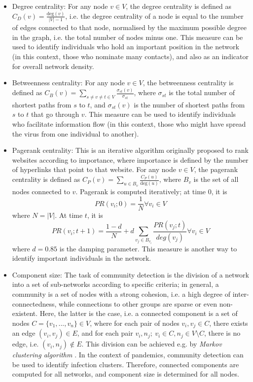 \begin{itemize}
	\item Degree centrality: For any node $v \in V$, the degree centrality is defined as $C_D(v) = \frac{\text{deg}(v)}{\lvert V \rvert - 1}$, i.e. the degree centrality of a node is equal to the number of edges connected to that node, normalised by the maximum possible degree in the graph, i.e. the total number of nodes minus one. This measure can be used to identify individuals who hold an important position in the network (in this context, those who nominate many contacts), and also as an indicator for overall network density.
	\item Betweenness centrality: For any node $v \in V$, the betweenness centrality is defined as $C_B(v) = \sum_{s\neq v\neq t\in V}\frac{\sigma_{st}(v)}{\sigma_{st}}$, where $\sigma_{st}$ is the total number of shortest paths from $s$ to $t$, and $\sigma_{st}(v)$ is the number of shortest paths from $s$ to $t$ that go through $v$. This measure can be used to identify individuals who facilitate information flow (in this context, those who might have spread the virus from one individual to another).
	\item Pagerank centrality: This is an iterative algorithm originally proposed to rank websites according to importance, where importance is defined by the number of hyperlinks that point to that website. For any node $v \in V$, the pagerank centrality is defined as $C_P(v) = \sum_{u \in B_v}\frac{C_P(u)}{\text{deg}(u)}$, where $B_v$ is the set of all nodes connected to $v$. Pagerank is computed iteratively; at time 0, it is
	\begin{equation*}
		PR(v_i;0) = \frac{1}{N} \forall v_i \in V
	\end{equation*}
	where $N = \lvert V \rvert$. At time $t$, it is
	\begin{equation*}
		PR(v_i;t+1) = \frac{1 - d}{N} + d \sum_{v_j \in B_{v_i}} \frac{PR(v_j;t)}{deg(v_j)} \forall v_i \in V
	\end{equation*}
	where $d = 0.85$ is the damping parameter. This measure is another way to identify important individuals in the network.
	\item Component size: The task of community detection is the division of a network into a set of sub-networks according to specific criteria; in general, a community is a set of nodes with a strong cohesion, i.e. a high degree of inter-connectedness, while connections to other groups are sparse or even non-existent. Here, the latter is the case, i.e. a connected component is a set of nodes $C = \{v_1,...,v_n\} \in V$, where for each pair of nodes $v_i,v_j \in C$, there exists an edge $(v_i,v_j) \in E$, and for each pair $v_i,n_j;\: v_i \in C, n_j \in V \setminus C$, there is no edge, i.e. $(v_i,n_j) \notin E$. This division can be achieved e.g. by \emph{Markov clustering algorithm} \cite{community_detection,markov_clustering}. In the context of pandemics, community detection can be used to identify infection clusters. Therefore, connected components are computed for all networks, and component size is determined for all nodes.

\end{itemize}
